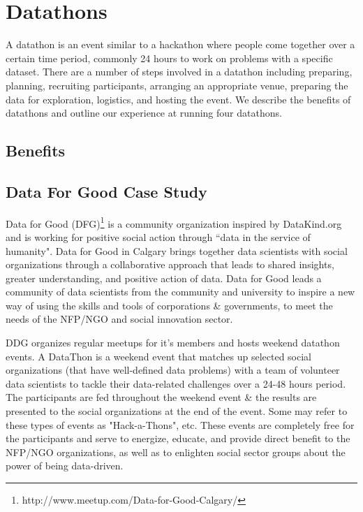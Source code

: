 \section{Datathons}

A datathon is an event similar to a hackathon where people come together over a certain time period, commonly 24 hours to work on problems with a specific dataset. There are a number of steps involved in a datathon including preparing, planning, recruiting participants, arranging an appropriate venue, preparing the data for exploration, logistics, and hosting the event. We describe the benefits of datathons and outline our experience at running four datathons.

\subsection{Benefits}

\subsection{Data For Good Case Study}


Data for Good (DFG)\footnote{http://www.meetup.com/Data-for-Good-Calgary/} is a community organization inspired by DataKind.org and is working for positive social action through ``data in the service of humanity". Data for Good in Calgary brings together data scientists with social organizations through a  collaborative approach that leads to shared insights, greater understanding, and positive action of data. Data for Good leads a community of data scientists from the community and university to inspire a new way of using the skills and tools of corporations \& governments, to meet the needs of the NFP/NGO and social innovation sector.

DDG organizes regular meetups for it's members and hosts weekend datathon events. A DataThon is a weekend event that matches up selected social organizations (that have well-defined data problems) with a team of volunteer data scientists to tackle their data-related challenges over a 24-48 hours period. The participants are fed throughout the weekend event \& the results are presented to the social organizations at the end of the event. Some may refer to these types of events as "Hack-a-Thons", etc. These events are completely free for the participants and serve to energize, educate, and provide direct benefit to the NFP/NGO organizations, as well as to enlighten social sector groups about the power of being data-driven.


